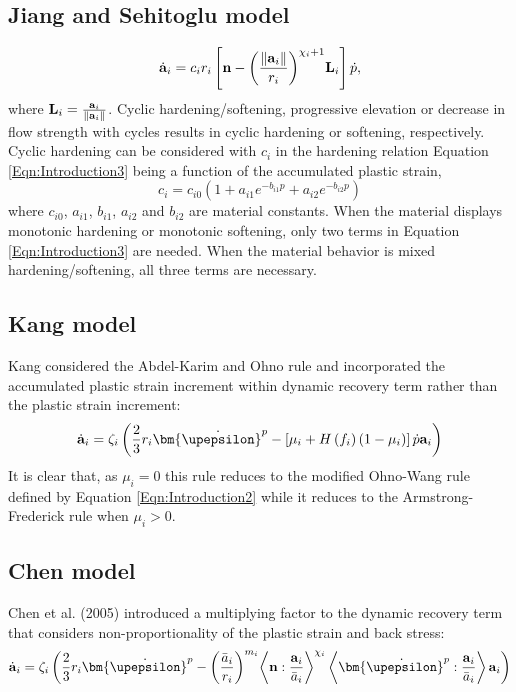 \subsection{Jiang and Sehitoglu model}
\begin{equation}
{{\dot{\bf a}}_i} = {c_i}{r_i}\left[ {{\bf{n}} - {{\left( {\frac{{\left\| {{{\bf{a}}_i}} \right\|}}{{{r_i}}}} \right)}^{{\chi _i} + 1}}{{\bf{L}}_i}} \right]\dot p,
\end{equation}
where ${{\bf{L}}_i} = \frac{{{{\bf{a}}_i}}}{{\left\| {{{\bf{a}}_i}} \right\|}}$.
Cyclic hardening/softening, progressive elevation or decrease in flow strength with cycles results in cyclic hardening or softening, respectively.
Cyclic hardening can be considered with $c_i$ in the hardening relation Equation \ref{Eqn:Introduction3} being a function of the accumulated plastic strain,
\begin{equation}
{c_i} = {c_{i0}}\left( {1 + {a_{i1}}{e^{ - {b_{i1}}p}} + {a_{i2}}{e^{ - {b_{i2}}p}}} \right)
\label{Eqn:Introduction3}
\end{equation}
where $c_{i0}$, $a_{i1}$, $b_{i1}$, $a_{i2}$ and $b_{i2}$ are material constants.
When the material displays monotonic hardening or monotonic softening, only two terms in Equation \ref{Eqn:Introduction3} are needed.
When the material behavior is mixed hardening/softening, all three terms are necessary.

\subsection{Kang model}
Kang considered the Abdel-Karim and Ohno rule and incorporated the accumulated plastic strain increment within dynamic recovery term rather than the plastic strain increment:
\begin{equation}
{{\dot{\bf a}}_i} = {\zeta _i}\left( {\frac{2}{3}{r_i}{{{\bm{\dot \upepsilon }}}^p} - \left[ {{\mu _i} + H\left( {{f_i}} \right)\left( {1 - {\mu _i}} \right)} \right]\dot p{{\bf{a}}_i}} \right)
\end{equation}
It is clear that, as $\mu_i=0$ this rule reduces to the modified Ohno-Wang rule defined by Equation \ref{Eqn:Introduction2} while it reduces to the Armstrong-Frederick rule when $\mu_i>0$.

\subsection{Chen model}
Chen et al. (2005) introduced a multiplying factor to the dynamic recovery term that considers non-proportionality of the plastic strain and back stress:
\begin{equation}
{{\dot{\bf a}}_i} = {\zeta _i}\left( {\frac{2}{3}{r_i}{{{\bm{\dot \upepsilon }}}^p} - {{\left( {\frac{{{{\bar a}_i}}}{{{r_i}}}} \right)}^{{m_i}}}{{\left\langle {{\bf{n}}:\frac{{{{\bf{a}}_i}}}{{{{\bar a}_i}}}} \right\rangle }^{{\chi _i}}}\left\langle {{{{\bm{\dot \upepsilon }}}^p}:\frac{{{{\bf{a}}_i}}}{{{{\bar a}_i}}}} \right\rangle {{\bf{a}}_i}} \right)
\end{equation}

